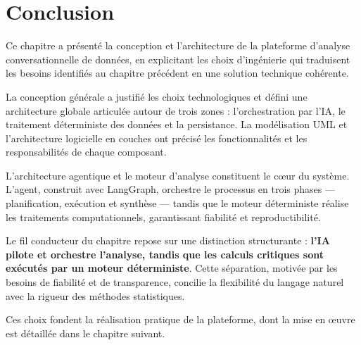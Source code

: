 \section{Conclusion}

Ce chapitre a présenté la conception et l'architecture de la plateforme
d'analyse conversationnelle de données, en explicitant les choix
d'ingénierie qui traduisent les besoins identifiés au chapitre précédent
en une solution technique cohérente.

La conception générale a justifié les choix technologiques et défini
une architecture globale articulée autour de trois zones : l'orchestration
par l'IA, le traitement déterministe des données et la persistance.
La modélisation UML et l'architecture logicielle en couches ont précisé
les fonctionnalités et les responsabilités de chaque composant.

L'architecture agentique et le moteur d'analyse constituent le cœur
du système. L'agent, construit avec LangGraph, orchestre le processus
en trois phases — planification, exécution et synthèse — tandis que
le moteur déterministe réalise les traitements computationnels,
garantissant fiabilité et reproductibilité.

Le fil conducteur du chapitre repose sur une distinction structurante :
\textbf{l'IA pilote et orchestre l'analyse, tandis que les calculs
critiques sont exécutés par un moteur déterministe}. Cette séparation,
motivée par les besoins de fiabilité et de transparence, concilie la
flexibilité du langage naturel avec la rigueur des méthodes statistiques.

Ces choix fondent la réalisation pratique de la plateforme, dont la
mise en œuvre est détaillée dans le chapitre suivant.